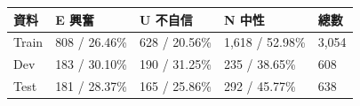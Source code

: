 \begin{tabular}{lllll}
\toprule
資料 & E 興奮 & U 不自信 & N 中性 & 總數\\
\midrule
Train & 808 / 26.46\% & 628 / 20.56\% & 1,618 / 52.98\% & 3,054\\
Dev & 183 / 30.10\% & 190 / 31.25\% & 235 / 38.65\% & 608\\
Test & 181 / 28.37\% & 165 / 25.86\% & 292 / 45.77\% & 638\\
\bottomrule
\end{tabular}
